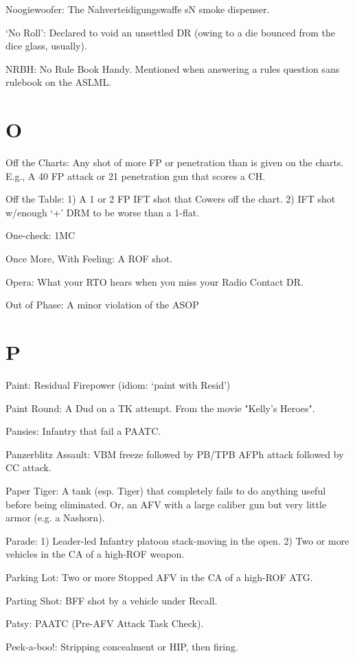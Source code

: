\documentclass[letterpaper]{article}
\begin{document}
Noogiewoofer: The Nahverteidigungswaffe sN smoke dispenser.

`No Roll': Declared to void an unsettled DR (owing to a die bounced from the dice glass, usually).

NRBH: No Rule Book Handy. Mentioned when answering a rules question sans rulebook on the ASLML.

\section{O}

Off the Charts: Any shot of more FP or penetration than is given on the charts. E.g., A 40 FP attack or 21 penetration gun that scores a CH.

Off the Table: 1) A 1 or 2 FP IFT shot that Cowers off the chart. 2) IFT shot w/enough `+' DRM to be worse than a 1-flat.

One-check: 1MC

Once More, With Feeling:  A ROF shot.

Opera: What your RTO hears when you miss your Radio Contact DR.

Out of Phase: A minor violation of the ASOP

\section{P}

Paint: Residual Firepower (idiom:  `paint with Resid')

Paint Round: A Dud on a TK attempt. From the movie "Kelly's Heroes".

Pansies: Infantry that fail a PAATC.

Panzerblitz Assault: VBM freeze followed by PB/TPB AFPh attack followed by CC attack.

Paper Tiger: A tank (esp. Tiger) that completely fails to do anything useful before being eliminated. Or, an AFV with a large caliber gun but very little armor (e.g. a Nashorn).

Parade: 1) Leader-led Infantry platoon stack-moving in the open. 2) Two or more vehicles in the CA of a high-ROF weapon.

Parking Lot: Two or more Stopped AFV in the CA of a high-ROF ATG.

Parting Shot: BFF shot by a vehicle under Recall.

Patsy:  PAATC (Pre-AFV Attack Task Check).

Peek-a-boo!: Stripping concealment or HIP, then firing.
\end{document}
